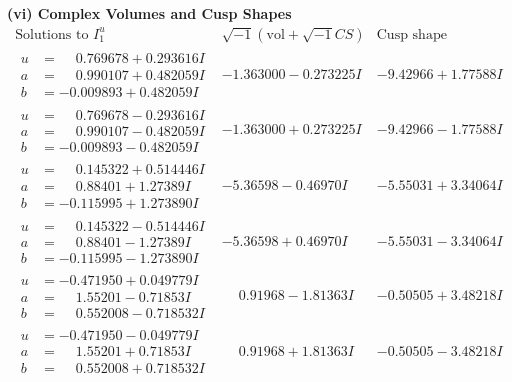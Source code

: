 \documentclass[1p]{elsarticle_modified}
\theoremstyle{definition}
\newcommand{\I}{\sqrt{-1}}
\begin{document}
\newpage\flushleft \textbf{(vi) Complex Volumes and Cusp Shapes}
$$\begin{array}{c|c|c}  
\text{Solutions to }I^u_{1}& \I (\text{vol} + \sqrt{-1}CS) & \text{Cusp shape}\\
 \hline 
\begin{aligned}
u &= \phantom{-}0.769678 + 0.293616 I \\
a &= \phantom{-}0.990107 + 0.482059 I \\
b &= -0.009893 + 0.482059 I\end{aligned}
 & -1.363000 - 0.273225 I & -9.42966 + 1.77588 I \\ \hline\begin{aligned}
u &= \phantom{-}0.769678 - 0.293616 I \\
a &= \phantom{-}0.990107 - 0.482059 I \\
b &= -0.009893 - 0.482059 I\end{aligned}
 & -1.363000 + 0.273225 I & -9.42966 - 1.77588 I \\ \hline\begin{aligned}
u &= \phantom{-}0.145322 + 0.514446 I \\
a &= \phantom{-}0.88401 + 1.27389 I \\
b &= -0.115995 + 1.273890 I\end{aligned}
 & -5.36598 - 0.46970 I & -5.55031 + 3.34064 I \\ \hline\begin{aligned}
u &= \phantom{-}0.145322 - 0.514446 I \\
a &= \phantom{-}0.88401 - 1.27389 I \\
b &= -0.115995 - 1.273890 I\end{aligned}
 & -5.36598 + 0.46970 I & -5.55031 - 3.34064 I \\ \hline\begin{aligned}
u &= -0.471950 + 0.049779 I \\
a &= \phantom{-}1.55201 - 0.71853 I \\
b &= \phantom{-}0.552008 - 0.718532 I\end{aligned}
 & \phantom{-}0.91968 - 1.81363 I & -0.50505 + 3.48218 I \\ \hline\begin{aligned}
u &= -0.471950 - 0.049779 I \\
a &= \phantom{-}1.55201 + 0.71853 I \\
b &= \phantom{-}0.552008 + 0.718532 I\end{aligned}
 & \phantom{-}0.91968 + 1.81363 I & -0.50505 - 3.48218 I \\ \hline\begin{aligned}

\end{aligned}
\end{array}$$
\end{document}
